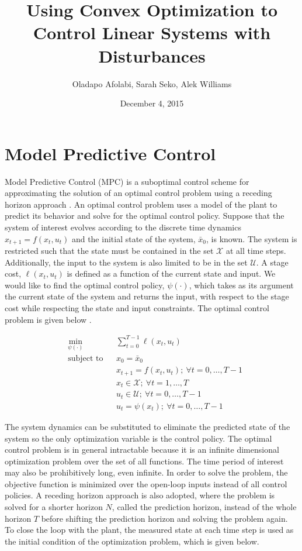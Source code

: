 \documentclass[12 pt]{report}
\title{Using Convex Optimization to Control Linear Systems with Disturbances}
\author{Oladapo Afolabi, Sarah Seko, Alek Williams}
\date{December 4, 2015}
\begin{document}
\maketitle

\begin{abstract}
\end{abstract}

\section{Model Predictive Control}

Model Predictive Control (MPC) is a suboptimal control scheme for approximating the solution of an optimal control problem using a receding horizon approach \cite{MPCbook}. An optimal control problem uses a model of the plant to predict its behavior and solve for the optimal control policy. Suppose that the system of interest evolves according to the discrete time dynamics $x_{t+1} = f(x_t, u_t)$ and the initial state of the system, $\bar{x}_0$, is known. The system is restricted such that the state must be contained in the set $\mathcal{X}$ at all time steps. Additionally, the input to the system is also limited to be in the set $\mathcal{U}$. A stage cost, $\ell (x_t, u_t)$ is defined as a function of the current state and input. We would like to find the optimal control policy, $\psi(\cdot)$, which takes as its argument the current state of the system and returns the input, with respect to the stage cost while respecting the state and input constraints. The optimal control problem is given below \cite{schildbach14}.

\begin{equation*}
\begin{aligned}
& \min_{\psi(\cdot)} & & \sum_{t = 0}^{T-1} \ell (x_t, u_t) \\
& \text{subject to} & & x_0 = \bar{x}_0 \\
& & & x_{t+1} = f(x_t, u_t); ~ \forall t = 0, \dots, T-1 \\
& & & x_t \in \mathcal{X}; ~ \forall t = 1, \dots, T \\
& & & u_t \in \mathcal{U}; ~ \forall t = 0, \dots, T-1 \\
& & & u_t = \psi (x_t); ~ \forall t = 0, \dots, T-1
\end{aligned}
\end{equation*}

The system dynamics can be substituted to eliminate the predicted state of the system so the only optimization variable is the control policy. The optimal control problem is in general intractable because it is an infinite dimensional optimization problem over the set of all functions. The time period of interest may also be prohibitively long, even infinite. In order to solve the problem, the objective function is minimized over the open-loop inputs instead of all control policies. A receding horizon approach is also adopted, where the problem is solved for a shorter horizon $N$, called the prediction horizon, instead of the whole horizon $T$ before shifting the prediction horizon and solving the problem again. To close the loop with the plant, the measured state at each time step is used as the initial condition of the optimization problem, which is given below.
\end{document}
